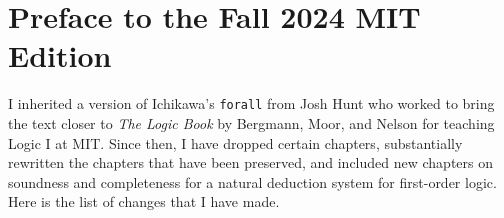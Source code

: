 
\chapter*{Preface to the Fall 2024 MIT Edition}
\label{ch.preface2}

I inherited a version of Ichikawa's {\tt forall} from Josh Hunt who worked to bring the text closer to \textit{The Logic Book} by Bergmann, Moor, and Nelson for teaching Logic I at MIT.
Since then, I have dropped certain chapters, substantially rewritten the chapters that have been preserved, and included new chapters on soundness and completeness for a natural deduction system for first-order logic.
Here is the list of changes that I have made. %

